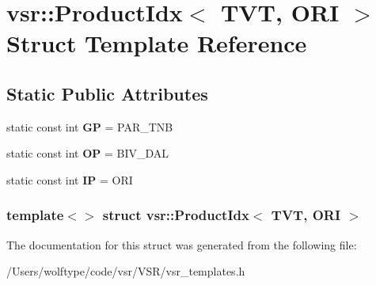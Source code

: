 \hypertarget{structvsr_1_1_product_idx_3_01_t_v_t_00_01_o_r_i_01_4}{\section{vsr\-:\-:Product\-Idx$<$ T\-V\-T, O\-R\-I $>$ Struct Template Reference}
\label{structvsr_1_1_product_idx_3_01_t_v_t_00_01_o_r_i_01_4}
}
\subsection*{Static Public Attributes}
\begin{DoxyCompactItemize}
\item 
\hypertarget{structvsr_1_1_product_idx_3_01_t_v_t_00_01_o_r_i_01_4_aa5fcb7e4387f0cfeaaa2565b9a4ab1e7}{static const int {\bfseries G\-P} = P\-A\-R\-\_\-\-T\-N\-B}\label{structvsr_1_1_product_idx_3_01_t_v_t_00_01_o_r_i_01_4_aa5fcb7e4387f0cfeaaa2565b9a4ab1e7}

\item 
\hypertarget{structvsr_1_1_product_idx_3_01_t_v_t_00_01_o_r_i_01_4_ae7bcc055fbcfd90390c313c5af52ffd3}{static const int {\bfseries O\-P} = B\-I\-V\-\_\-\-D\-A\-L}\label{structvsr_1_1_product_idx_3_01_t_v_t_00_01_o_r_i_01_4_ae7bcc055fbcfd90390c313c5af52ffd3}

\item 
\hypertarget{structvsr_1_1_product_idx_3_01_t_v_t_00_01_o_r_i_01_4_ac4c6dd062f5968c2ed844206a6459488}{static const int {\bfseries I\-P} = O\-R\-I}\label{structvsr_1_1_product_idx_3_01_t_v_t_00_01_o_r_i_01_4_ac4c6dd062f5968c2ed844206a6459488}

\end{DoxyCompactItemize}
\subsubsection*{template$<$$>$ struct vsr\-::\-Product\-Idx$<$ T\-V\-T, O\-R\-I $>$}



The documentation for this struct was generated from the following file\-:\begin{DoxyCompactItemize}
\item 
/\-Users/wolftype/code/vsr/\-V\-S\-R/vsr\-\_\-templates.\-h\end{DoxyCompactItemize}
